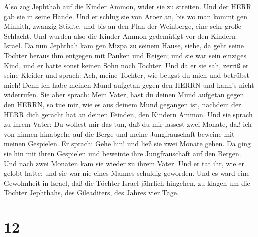  Also zog Jephthah auf die Kinder Ammon, wider sie zu
streiten. Und der HERR gab sie in seine Hände.  Und er
schlug sie von Aroer an, bis wo man kommt gen Minnith, zwanzig Städte,
und bis an den Plan der Weinberge, eine sehr große Schlacht. Und wurden
also die Kinder Ammon gedemütigt vor den Kindern Israel. 
Da nun Jephthah kam gen Mizpa zu seinem Hause, siehe, da geht seine
Tochter heraus ihm entgegen mit Pauken und Reigen; und sie war sein
einziges Kind, und er hatte sonst keinen Sohn noch Tochter.
 Und da er sie sah, zerriß er seine Kleider und sprach:
Ach, meine Tochter, wie beugst du mich und betrübst mich! Denn ich habe
meinen Mund aufgetan gegen den HERRN und kann's nicht widerrufen.
 Sie aber sprach: Mein Vater, hast du deinen Mund aufgetan
gegen den HERRN, so tue mir, wie es aus deinem Mund gegangen ist,
nachdem der HERR dich gerächt hat an deinen Feinden, den Kindern Ammon.
 Und sie sprach zu ihrem Vater: Du wollest mir das tun, daß
du mir lassest zwei Monate, daß ich von hinnen hinabgehe auf die Berge
und meine Jungfrauschaft beweine mit meinen Gespielen.  Er
sprach: Gehe hin! und ließ sie zwei Monate gehen. Da ging sie hin mit
ihren Gespielen und beweinte ihre Jungfrauschaft auf den Bergen.
 Und nach zwei Monaten kam sie wieder zu ihrem Vater. Und
er tat ihr, wie er gelobt hatte; und sie war nie eines Mannes schuldig
geworden. Und es ward eine Gewohnheit in Israel,  daß die
Töchter Israel jährlich hingehen, zu klagen um die Tochter Jephthahs,
des Gileaditers, des Jahres vier Tage.

\hypertarget{section-11}{%
\section{12}\label{section-11}}

